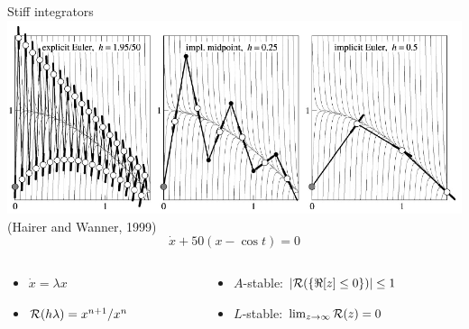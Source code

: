 \begin{frame}{Stiff integrators}
  \includegraphics[width=\textwidth]{figures/HairerWanner-stiff}
  \vspace{-.9em}
  {\scriptsize \raggedleft (Hairer and Wanner, 1999)}
  \begin{equation*}
    \dot{x} + 50 (x - \cos t) = 0
  \end{equation*}
  \vspace{-1em}
  \begin{columns}
    \begin{column}{0.4\textwidth}
      \begin{itemize}
      \item $ \dot{x} = \lambda x $
      \item $\mathcal{R}(h \lambda) = x^{n+1}/x^n$
      \end{itemize}
    \end{column}
    \begin{column}{0.6\textwidth}
      \begin{itemize}
      \item $A$-stable: $\left\lvert \mathcal{R}(\{\Re [z] \le 0\}) \right\rvert \le 1$
      \item $L$-stable: $\lim_{z \to \infty} \mathcal{R}(z) = 0$
      \end{itemize}
    \end{column}
  \end{columns}
\end{frame}
